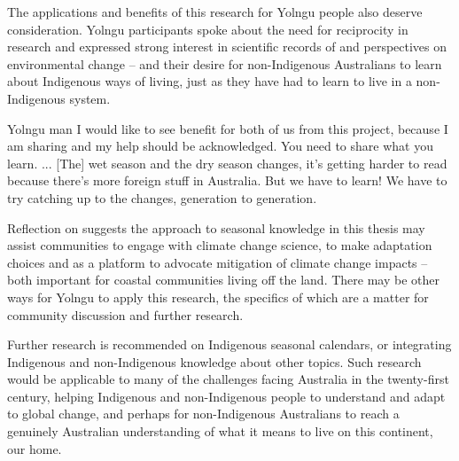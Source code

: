 The applications and benefits of this research for Yolngu people also deserve
consideration.  Yolngu participants spoke about the need for reciprocity in research
and expressed strong interest in scientific records of and perspectives on
environmental change -- and their desire for non-Indigenous Australians to
learn about Indigenous ways of living, just as they have had to learn to
live in a non-Indigenous system.
\begin{pquote}{Yolngu man}
    I would like to see benefit for both of us from this project, because I am
    sharing and my help should be acknowledged.  You need to share what you learn. ...
    [The] wet season and the dry season changes, it's getting harder to read
    because there's more foreign stuff in Australia.  But we have to learn!
    We have to try catching up to the changes, generation to generation.
\end{pquote}
Reflection on \citet{petheram2010} suggests the approach to seasonal knowledge in this thesis
may assist communities to engage with climate change science, to make
adaptation choices and as a platform to advocate mitigation of climate change impacts -- both
important for coastal communities living off the land.  There may be other
ways for Yolngu to apply this research, the specifics of which are a matter for
community discussion and further research.


Further research is recommended on Indigenous seasonal calendars, or
integrating Indigenous and non-Indigenous knowledge about other topics.  Such
research would be applicable to many of the challenges facing
Australia in the twenty-first century, helping Indigenous and non-Indigenous
people to understand and adapt to global change, and perhaps for non-Indigenous
Australians to reach a genuinely Australian understanding of what it means to
live on this continent, our home.

